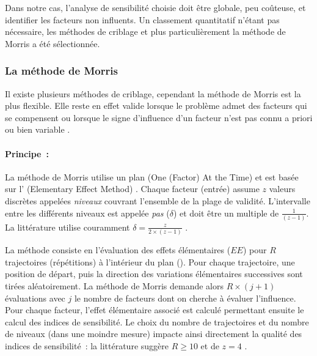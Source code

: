 Dans notre cas, l’analyse de sensibilité choisie doit être globale, peu coûteuse,
et identifier les facteurs non influents. Un classement quantitatif n’étant pas
nécessaire, les méthodes de criblage et plus particulièrement la méthode de Morris
a été sélectionnée.



\subsubsection{La méthode de Morris} %
\label{ssub:la_methode_de_morris}
Il existe plusieurs méthodes de criblage, cependant la méthode de Morris \parencite{Morris1991161}
est la plus flexible. Elle reste en effet valide lorsque le problème admet des facteurs
qui se compensent ou lorsque le signe d’influence d’un facteur n’est pas connu a priori
ou bien variable \parencite{Saltelli2004}.

\paragraph{Principe~:} %
\label{par:principe}
La méthode de Morris utilise un plan  (One (Factor) At the Time) et est basée
sur l’ (Elementary Effect Method) \parencite{Saltelli2004}. Chaque facteur
(entrée) assume $z$ valeurs discrètes appelées \textit{niveaux} couvrant l’ensemble de la
plage de validité. L’intervalle entre les différents niveaux est appelée \textit{pas}
($\delta$) et doit être un multiple de $\frac{1}{(z - 1)}$. La littérature utilise
couramment $\delta = \frac{z}{2 \times (z - 1)}$ \parencite{Morris1991161, Campolongo20071509}.

La méthode consiste en l’évaluation des effets élémentaires ($EE$) pour $R$ trajectoires
(répétitions) à l’intérieur du plan  ().
Pour chaque trajectoire, une position de départ, puis la direction des variations
élémentaires successives sont tirées aléatoirement. La méthode de Morris demande alors $R
\times (j + 1)$ évaluations avec $j$ le nombre de facteurs dont on cherche à évaluer
l’influence. Pour chaque facteur, l’effet élémentaire associé est calculé permettant ensuite
le calcul des indices de sensibilité. Le choix du nombre de trajectoires et du nombre de
niveaux (dans une moindre mesure) impacte ainsi directement la qualité des indices de
sensibilité~: la littérature suggère $R \geq 10$ et de $z = 4$ \parencite{Campolongo20071509}.

